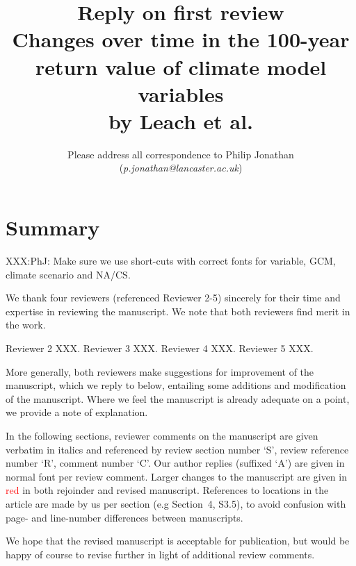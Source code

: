 \documentclass[a4paper,10pt]{article}
\providecommand{\np}{\vspace{10pt}}
\newcommand{\ed}[1]{\textcolor{red}{#1}}
\providecommand{\np}{\vspace{10pt}}
\begin{document}
	
	\title{\textbf{Reply on first review} \np \\ Changes over time in the 100-year return value of climate model variables \np \\ by Leach et al.}
	\np
	\author{Please address all correspondence to Philip Jonathan (\emph{p.jonathan@lancaster.ac.uk})}
	\date{}
	\maketitle
	
	\section*{Summary}
	
	XXX:PhJ: Make sure we use short-cuts with correct fonts for variable, GCM, climate scenario and NA/CS.
	
	We thank four reviewers (referenced Reviewer 2-5) sincerely for their time and expertise in reviewing the manuscript. We note that both reviewers find merit in the work. 
	
	Reviewer 2 XXX. Reviewer 3 XXX. Reviewer 4 XXX. Reviewer 5 XXX.
	
	More generally, both reviewers make suggestions for improvement of the manuscript, which we reply to below, entailing some additions and modification of the manuscript. Where we feel the manuscript is already adequate on a point, we provide a note of explanation. 
	
	In the following sections, reviewer comments on the manuscript are given verbatim in italics and referenced by review section number `S', review reference number `R', comment number `C'. Our author replies (suffixed `A') are given in normal font per review comment. Larger changes to the manuscript are given in \ed{red} in both rejoinder and revised manuscript. References to locations in the article are made by us per section (e.g Section~4, S3.5), to avoid confusion with page- and line-number differences between manuscripts. 
	
	We hope that the revised manuscript is acceptable for publication, but would be happy of course to revise further in light of additional review comments.
	
\end{document}
